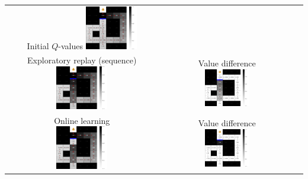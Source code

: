 \documentclass{article}
\begin{document}
\begin{center}
    \begin{tabular}{ccc}
        \shortstack{Initial $Q$-values \\ \includegraphics[width=0.35\textwidth]{Figures/q_mb.pdf}} &  \\
        \shortstack{Exploratory replay (sequence) \\ \includegraphics[width=0.35\textwidth]{Figures/replay_explore.pdf}} & \shortstack{Value difference \\ \includegraphics[width=0.35\textwidth]{Figures/replay_explore_diff.pdf}}\\
        \shortstack{Online learning \\ \includegraphics[width=0.35\textwidth]{Figures/online.pdf}} & \shortstack{Value difference \\ \includegraphics[width=0.35\textwidth]{Figures/online_diff.pdf}} \\

\end{tabular}
\end{center}
\end{document}
